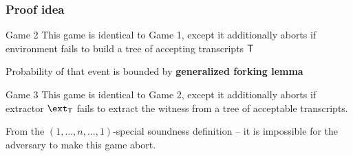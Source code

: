\documentclass[aspectratio=169]{beamer}
\renewcommand{\emph}[1]{\textbf{#1}}
\begin{document}
\begin{frame}
  \frametitle{Proof idea}
\begin{block}{Game 2}
  This game is identical to Game 1, except it additionally aborts if environment
  fails to build a tree of accepting transcripts $\mathsf{T}$

  Probability of that event is bounded by \emph{generalized forking lemma}
\end{block}\pause

\begin{block}{Game 3}
  This game is identical to Game 2, except it additionally aborts if extractor
  $\ext_\tree$ fails to extract the witness from a tree of acceptable
  transcripts.

  From the $(1, \ldots, n, \ldots, 1)$-special soundness definition -- it is
  impossible for the adversary to make this game abort.
\end{block}

\end{frame}
\end{document}
